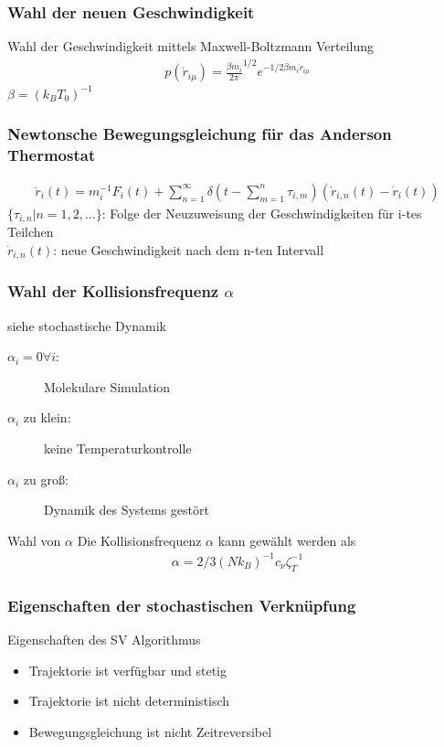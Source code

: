 \documentclass{beamer}
\begin{document}
\begin{frame} 
	\frametitle{Wahl der neuen Geschwindigkeit}
	 Wahl der Geschwindigkeit mittels Maxwell-Boltzmann Verteilung
	\begin{align*}
		p(\dot{r}_{i \mu}) = {\frac{\beta m_i}{2 \pi}}^{1/2} e^{-1/2 \beta m_i \dot{r}_{i \mu}}
	\end{align*}
	$\beta = (k_B T_0)^{-1}$
\end{frame}


\begin{frame} 
	\frametitle{Newtonsche Bewegungsgleichung für das Anderson Thermostat}
	\begin{align*}
	\ddot{r}_i(t) = m_i^{-1} F_i(t) + \sum\limits_{n=1}^{\infty} \delta \left(  t - \sum\limits_{m=1}^n \tau_{i,m}\right) \left( \dot{r}_{i,n}(t) - \dot{r}_i(t) \right)
	\end{align*}
	 $\{\tau_{i,n}| n=1,2, \dots\}$:  Folge der Neuzuweisung der Geschwindigkeiten für i-tes Teilchen \\
	 $\dot{r}_{i,n}(t)$: neue Geschwindigkeit nach dem n-ten Intervall
\end{frame}


\begin{frame} 
	\frametitle{Wahl der Kollisionsfrequenz $\alpha$}
	siehe stochastische Dynamik
	\begin{description}
		\item[$\alpha_i=0 \forall i$:] Molekulare Simulation
		\item[$\alpha_i$ zu klein:] keine Temperaturkontrolle
		\item[$\alpha_i$ zu groß:] Dynamik des Systems gestört 
	\end{description}
	\begin{block}{Wahl von $\alpha$}
		Die Kollisionsfrequenz $\alpha$ kann gewählt werden als
		\begin{align*}
			\alpha = 2/3 (N k_B)^{-1} c_{\nu} \zeta_T^{-1}
		\end{align*}
	\end{block}	
\end{frame}


\begin{frame} 
	\frametitle{Eigenschaften der stochastischen Verknüpfung} 
	\begin{block}{Eigenschaften des SV Algorithmus}
		\begin{itemize}
			\item Trajektorie ist verfügbar und stetig
			\item  Trajektorie ist nicht deterministisch
			\item Bewegungsgleichung ist nicht Zeitreversibel
		\end{itemize}
	\end{block}
\end{frame}
\end{document}
